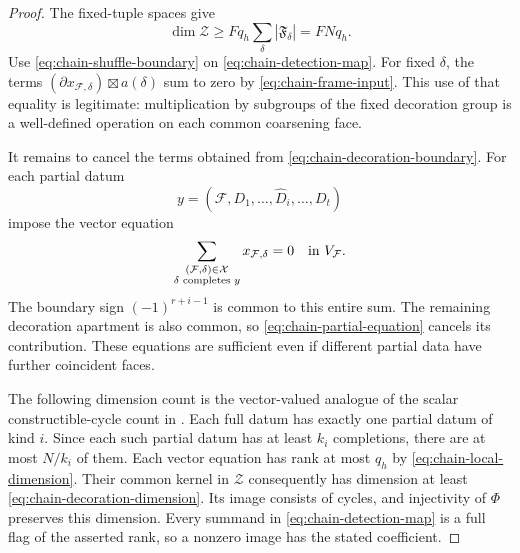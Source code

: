 \begin{proof}
The fixed-tuple spaces give
\[
 \dim\mathcal Z
 \geq Fq_h\sum_\delta|\mathfrak F_\delta|=FNq_h.
\]
Use \eqref{eq:chain-shuffle-boundary} on
\eqref{eq:chain-detection-map}. For fixed $\delta$, the terms
$(\partial x_{\mathcal F,\delta})\boxtimes a(\delta)$ sum to
zero by \eqref{eq:chain-frame-input}. This use of that equality is
legitimate: multiplication by subgroups of the fixed decoration
group is a well-defined operation on each common coarsening face.

It remains to cancel the terms obtained from
\eqref{eq:chain-decoration-boundary}. For each partial datum
\[
 y=(\mathcal F,D_1,\ldots,\widehat D_i,\ldots,D_t)
\]
impose the vector equation
\begin{equation}\label{eq:chain-partial-equation}
 \sum_{\substack{(\mathcal F,\delta)\in\mathcal X\\
                  \delta\text{ completes }y}}
           x_{\mathcal F,\delta}=0
       \quad\hbox{in }V_{\mathcal F}.
\end{equation}
The boundary sign $(-1)^{r+i-1}$ is common to this entire sum.
The remaining decoration apartment is also common, so
\eqref{eq:chain-partial-equation} cancels its contribution.
These equations are sufficient even if different partial data
have further coincident faces.

The following dimension count is the vector-valued analogue of the
scalar constructible-cycle count in
\citet[equation~(17), arXiv version~1]{DiazRamos2018}.
Each full datum has exactly one partial datum of kind $i$.
Since each such partial datum has at least $k_i$ completions,
there are at most $N/k_i$ of them. Each vector equation has
rank at most $q_h$ by \eqref{eq:chain-local-dimension}. Their
common kernel in $\mathcal Z$ consequently has dimension at least
\eqref{eq:chain-decoration-dimension}. Its image consists of
cycles, and injectivity of $\Phi$ preserves this dimension.
Every summand in \eqref{eq:chain-detection-map} is a full flag
of the asserted rank, so a nonzero image has the stated coefficient.
\end{proof}

